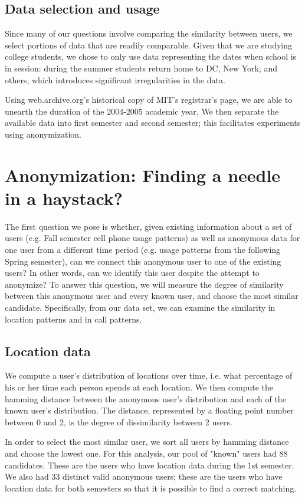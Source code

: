 \documentclass[pageno]{jpaper}
\begin{document}
\subsection{Data selection and usage}

Since many of our questions involve comparing the similarity between users, we select portions of data that are readily comparable. Given that we are studying college students, we chose to only use data representing the dates when school is in session: during the summer students return home to DC, New York, and others, which introduces significant irregularities in the data. 

Using web.archive.org's historical copy of MIT's registrar's page, we are able to unearth the duration of the 2004-2005 academic year. We then separate the available data into first semester and second semester; this facilitates experiments using anonymization. 

\section{Anonymization: Finding a needle in a haystack?}

The first question we pose is whether, given existing information about a set of users (e.g. Fall semester cell phone usage patterns) as well as anonymous data for one user from a different time period (e.g. usage patterns from the following Spring semester), can we connect this anonymous user to one of the existing users? In other words, can we identify this user despite the attempt to anonymize? To answer this question, we will measure the degree of similarity between this anonymous user and every known user, and choose the most similar candidate. Specifically, from our data set, we can examine the similarity in location patterns and in call patterns. 

\subsection{Location data}

We compute a user's distribution of locations over time, i.e. what percentage of his or her time each person spends at each location. We then compute the hamming distance between the anonymous user's distribution and each of the known user's distribution. The distance, represented by a floating point number between 0 and 2, is the degree of dissimilarity between 2 users. 

In order to select the most similar user, we sort all users by hamming distance and choose the lowest one. For this analysis, our pool of "known" users had 88 candidates. These are the users who have location data during the 1st semester. We also had 33 distinct valid anonymous users; these are the users who have location data for both semesters so that it is possible to find a correct matching. 
\end{document}
